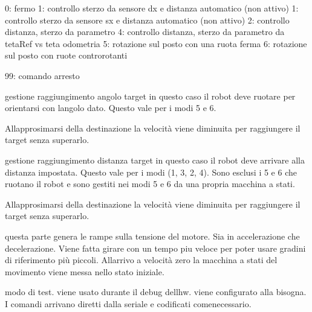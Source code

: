 0\+: fermo 1\+: controllo sterzo da sensore dx e distanza automatico (non attivo) 1\+: controllo sterzo da sensore sx e distanza automatico (non attivo) 2\+: controllo distanza, sterzo da parametro 4\+: controllo distanza, sterzo da parametro da teta\+Ref vs teta odometria 5\+: rotazione sul posto con una ruota ferma 6\+: rotazione sul posto con ruote controrotanti

99\+: comando arresto

gestione raggiungimento angolo target in questo caso il robot deve ruotare per orientarsi con l\textquotesingle{}angolo dato. Questo vale per i modi 5 e 6.

All\textquotesingle{}approsimarsi della destinazione la velocità viene diminuita per raggiungere il target senza superarlo. ~\newline
~\newline
~\newline
~\newline


gestione raggiungimento distanza target in questo caso il robot deve arrivare alla distanza impostata. Questo vale per i modi (1, 3, 2, 4). Sono esclusi i 5 e 6 che ruotano il robot e sono gestiti nei modi 5 e 6 da una propria macchina a stati.

All\textquotesingle{}approsimarsi della destinazione la velocità viene diminuita per raggiungere il target senza superarlo. ~\newline
~\newline
~\newline


questa parte genera le rampe sulla tensione del motore. Sia in accelerazione che decelerazione. Viene fatta girare con un tempo piu\textquotesingle{} veloce per poter usare gradini di riferimento più piccoli. All\textquotesingle{}arrivo a velocità zero la macchina a stati del movimento viene messa nello stato iniziale.

modo di test. viene usato durante il debug dell\textquotesingle{}hw. viene configurato alla bisogna. I comandi arrivano diretti dalla seriale e codificati comenecessario.\mbox{\label{ari_pi__2_d_c__esp__08_8ino_a6af06b46b74b5a44e1adc270e1e07e6b}} 
